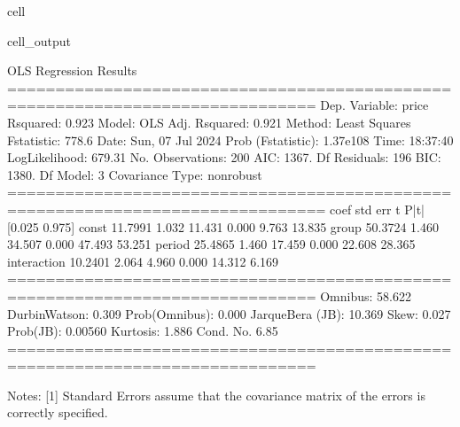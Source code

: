 \documentclass[letterpaper,10pt,english]{jupyterBook}
\begin{document}
\begin{sphinxuseclass}{cell}
\begin{sphinxVerbatimOutput}
\begin{sphinxuseclass}{cell_output}
\begin{sphinxVerbatim}[commandchars=\\\{\}]
                            OLS Regression Results                            
==============================================================================
Dep. Variable:                  price   R\PYGZhy{}squared:                       0.923
Model:                            OLS   Adj. R\PYGZhy{}squared:                  0.921
Method:                 Least Squares   F\PYGZhy{}statistic:                     778.6
Date:                Sun, 07 Jul 2024   Prob (F\PYGZhy{}statistic):          1.37e\PYGZhy{}108
Time:                        18:37:40   Log\PYGZhy{}Likelihood:                \PYGZhy{}679.31
No. Observations:                 200   AIC:                             1367.
Df Residuals:                     196   BIC:                             1380.
Df Model:                           3                                         
Covariance Type:            nonrobust                                         
===============================================================================
                  coef    std err          t      P\PYGZgt{}|t|      [0.025      0.975]
\PYGZhy{}\PYGZhy{}\PYGZhy{}\PYGZhy{}\PYGZhy{}\PYGZhy{}\PYGZhy{}\PYGZhy{}\PYGZhy{}\PYGZhy{}\PYGZhy{}\PYGZhy{}\PYGZhy{}\PYGZhy{}\PYGZhy{}\PYGZhy{}\PYGZhy{}\PYGZhy{}\PYGZhy{}\PYGZhy{}\PYGZhy{}\PYGZhy{}\PYGZhy{}\PYGZhy{}\PYGZhy{}\PYGZhy{}\PYGZhy{}\PYGZhy{}\PYGZhy{}\PYGZhy{}\PYGZhy{}\PYGZhy{}\PYGZhy{}\PYGZhy{}\PYGZhy{}\PYGZhy{}\PYGZhy{}\PYGZhy{}\PYGZhy{}\PYGZhy{}\PYGZhy{}\PYGZhy{}\PYGZhy{}\PYGZhy{}\PYGZhy{}\PYGZhy{}\PYGZhy{}\PYGZhy{}\PYGZhy{}\PYGZhy{}\PYGZhy{}\PYGZhy{}\PYGZhy{}\PYGZhy{}\PYGZhy{}\PYGZhy{}\PYGZhy{}\PYGZhy{}\PYGZhy{}\PYGZhy{}\PYGZhy{}\PYGZhy{}\PYGZhy{}\PYGZhy{}\PYGZhy{}\PYGZhy{}\PYGZhy{}\PYGZhy{}\PYGZhy{}\PYGZhy{}\PYGZhy{}\PYGZhy{}\PYGZhy{}\PYGZhy{}\PYGZhy{}\PYGZhy{}\PYGZhy{}\PYGZhy{}\PYGZhy{}
const          11.7991      1.032     11.431      0.000       9.763      13.835
group          50.3724      1.460     34.507      0.000      47.493      53.251
period         25.4865      1.460     17.459      0.000      22.608      28.365
interaction   \PYGZhy{}10.2401      2.064     \PYGZhy{}4.960      0.000     \PYGZhy{}14.312      \PYGZhy{}6.169
==============================================================================
Omnibus:                       58.622   Durbin\PYGZhy{}Watson:                   0.309
Prob(Omnibus):                  0.000   Jarque\PYGZhy{}Bera (JB):               10.369
Skew:                          \PYGZhy{}0.027   Prob(JB):                      0.00560
Kurtosis:                       1.886   Cond. No.                         6.85
==============================================================================

Notes:
[1] Standard Errors assume that the covariance matrix of the errors is correctly specified.
\end{sphinxVerbatim}

\end{sphinxuseclass}\end{sphinxVerbatimOutput}

\end{sphinxuseclass}
\end{document}

